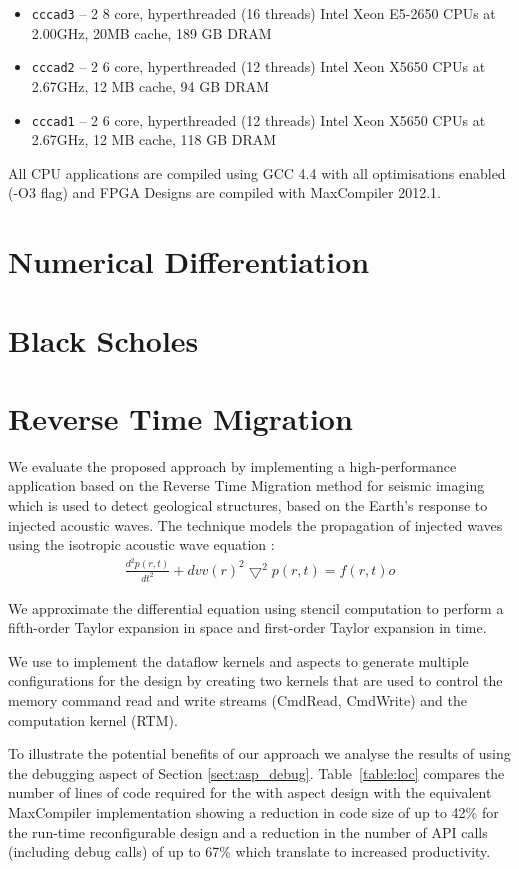 \begin{itemize}
\item \texttt{cccad3} -- 2 8 core, hyperthreaded (16 threads) Intel
  Xeon E5-2650 CPUs at 2.00GHz, 20MB cache, 189 GB DRAM
\item \texttt{cccad2} -- 2 6 core, hyperthreaded (12 threads) Intel
  Xeon X5650 CPUs at 2.67GHz, 12 MB cache, 94 GB DRAM
\item \texttt{cccad1} -- 2 6 core, hyperthreaded (12 threads) Intel Xeon
  X5650 CPUs at 2.67GHz, 12 MB cache, 118 GB DRAM
\end{itemize}

All CPU applications are compiled using GCC 4.4 with all optimisations
enabled (-O3 flag) and FPGA Designs are compiled with MaxCompiler
2012.1.

\section{Numerical Differentiation}

\section{Black Scholes}

\section{Reverse Time Migration}
\label{sec:RTM}
We evaluate the proposed approach by implementing a high-performance
application based on the Reverse Time Migration method for seismic
imaging which is used to detect geological structures, based on the
Earth's response to injected acoustic waves. The technique models the
propagation of injected waves using the isotropic acoustic wave
equation \cite{araya2011assessing}:
\begin{align}
\frac{d^2p(r,t)}{dt^2} + {dvv(r)}^2\bigtriangledown^2p(r,t) = f(r,t)
o\end{align}

We approximate the differential equation using stencil computation to
perform a fifth-order Taylor expansion in space and first-order Taylor
expansion in time.

We use \FAST{} to implement the dataflow kernels and aspects to
generate multiple configurations for the design by creating two
kernels that are used to control the memory command read and write
streams (CmdRead, CmdWrite) and the computation kernel (RTM).

To illustrate the potential benefits of our approach we analyse the
results of using the debugging aspect of Section
\ref{sect:asp_debug}. Table~\ref{table:loc} compares the number of
lines of code required for the \FAST{} with aspect design with the
equivalent MaxCompiler implementation showing a reduction in code size
of up to 42\% for the run-time reconfigurable design and a reduction
in the number of API calls (including debug calls) of up to 67\% which
translate to increased productivity.

